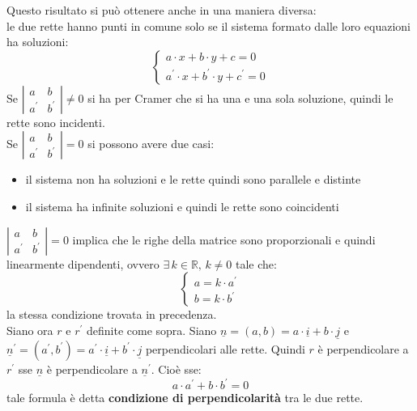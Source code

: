 \documentclass[a4paper,12pt, oneside]{book}
\begin{document}
\newpage
Questo risultato si può ottenere anche in una maniera diversa:\\
le due rette hanno punti in comune solo se il sistema formato dalle loro equazioni ha soluzioni:
$$\begin{cases}
a\cdot x+b\cdot y+c=0\\
a^{'}\cdot x+b^{'}\cdot y+c^{'}=0
\end{cases}
$$
Se $
\left|\begin{matrix}
a & b\\
a^{'} & b^{'}
\end{matrix}\right|\neq 0
$ si ha per Cramer che si ha una e una sola soluzione, quindi le rette sono incidenti.\\
Se $
\left|\begin{matrix}
a & b\\
a^{'} & b^{'}
\end{matrix}\right|= 0
$ si possono avere due casi:
\begin{itemize}
\item il sistema non ha soluzioni e le rette quindi sono parallele e distinte
\item il sistema ha infinite soluzioni e quindi le rette sono coincidenti
\end{itemize}
$
\left|\begin{matrix}
a & b\\
a^{'} & b^{'}
\end{matrix}\right|= 0
$ implica che le righe della matrice sono proporzionali e quindi linearmente dipendenti, ovvero $\exists \, k\in\mathbb{R},\,k\neq 0$ tale che:
$$\begin{cases}
a=k\cdot a^{'}\\
b=k\cdot b^{'}
\end{cases}  
$$
la stessa condizione trovata in precedenza.\\
Siano ora $r$ e $r^{'}$ definite come sopra. Siano $\underline{n}=(a,b)=a\cdot \underline{i}+b\cdot\underline{j}$ e $\underline{n}^{'}=(a^{'},b^{'})=a^{'}\cdot \underline{i}+b^{'}\cdot\underline{j}$ perpendicolari alle rette. Quindi $r$ è perpendicolare a $r^{'}$ sse $\underline{n}$ è perpendicolare a $\underline{n}^{'}$. Cioè sse:
$$a\cdot a^{'}+b\cdot b^{'}=0$$
tale formula è detta \textbf{condizione di perpendicolarità} tra le due rette.
\end{document}
